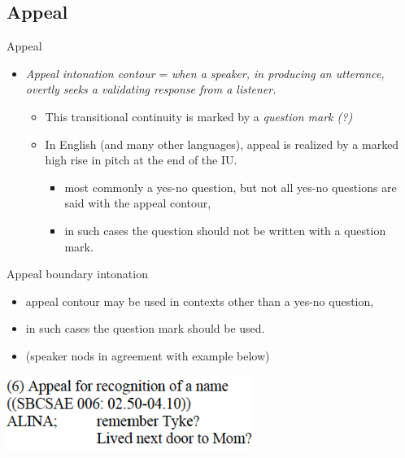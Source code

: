 \documentclass[compress,12pt]{beamer}%
\begin{document}
\subsection{Appeal}

  \begin{frame}{Appeal}
    \begin{itemize}
      \item[] \emph{Appeal intonation contour} = \textit{when a speaker, in producing an utterance, overtly seeks a validating response from a listener.}
      \begin{itemize}
        \item This transitional continuity is marked by a \emph{question mark (?)}
        \item In English (and many other languages), appeal is realized by a marked high rise in pitch at the end of the IU.
        \begin{itemize} 
          \item most commonly a yes-no question, but not all yes-no questions are said with the appeal contour, 
          \item in such cases the question should not be written with a question mark.
        \end{itemize}
      \end{itemize}
    \end{itemize}  
  \end{frame}

  \begin{frame}{Appeal boundary intonation}
    \begin{itemize}
        \item appeal contour may be used in contexts other than a yes-no question,  
        \item in such cases the question mark should be used.
        \item[] (speaker nods in agreement with example below)    
    \end{itemize}
    \hfill\includegraphics[width=0.6\textwidth]{images/Appeal_Ex6.png}\\
    \hfill{}
  \end{frame}
\end{document}
